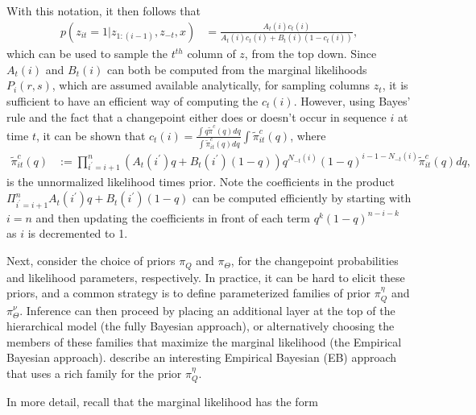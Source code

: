 \documentclass[14pt]{extreport}
\begin{document}
With this notation, it then follows that
\begin{align*}
  p\left(z_{it} = 1 \vert z_{1:(i - 1)}, z_{-t}, x\right) &= \frac{A_{t}\left(i\right)c_{t}\left(i\right)}{A_{t}\left(i\right)c_t\left(i\right) + B_t\left(i\right)\left(1 - c_t\left(i\right)\right)},
\end{align*}
which can be used to sample the $t^{th}$ column of $z$, from the top down. Since
$A_{t}\left(i\right)$ and $B_{t}\left(i\right)$ can both be computed from the
marginal likelihoods $P_{i}\left(r, s\right)$, which are assumed available
analytically, for sampling columns $z_t$, it is sufficient to have an efficient
way of computing the $c_{t}\left(i\right)$. However, using Bayes' rule and the
fact that a changepoint either does or doesn't occur in sequence $i$ at time
$t$, it can be shown that $c_{t}\left(i\right) = \frac{\int q
  \tilde{\pi}^{c}\left(q\right) dq}{\int \tilde{\pi}_{it}^{c}\left(q\right)
  dq}{\int \tilde{\pi}_{it}^{c}\left(q\right)}$, where
\begin{align*}
  \tilde{\pi}_{it}^{c}\left(q\right) &:= \prod_{i^\prime = i + 1}^{n} \left(A_{t}\left(i^\prime\right)q + B_{t}\left(i^\prime\right)\left(1 - q\right)\right)q^{N_{-t}\left(i\right)}\left(1 - q\right)^{i - 1 - N_{-t}\left(i\right)} \tilde{\pi}_{it}^{c}\left(q\right) dq,
\end{align*}
is the unnormalized likelihood times prior. Note the coefficients in the product
$\Pi_{i^\prime = i + 1}^{n} A_{t}\left(i^\prime\right)q +
B_{t}\left(i^\prime\right)\left(1 - q\right)$ can be computed efficiently by
starting with $i = n$ and then updating the coefficients in front of each term
$q^k \left(1 - q\right)^{n - i - k}$ as $i$ is decremented to 1.

Next, consider the choice of priors $\pi_{Q}$ and $\pi_{\Theta}$, for the
changepoint probabilities and likelihood parameters, respectively. In practice,
it can be hard to elicit these priors, and a common strategy is to define
parameterized families of prior $\pi_{Q}^{\eta}$ and $\pi_{\Theta}^{\nu}$.
Inference can then proceed by placing an additional layer at the top of the
hierarchical model (the fully Bayesian approach), or alternatively choosing the
members of these families that maximize the marginal likelihood (the Empirical
Bayesian approach). \citep{fan2015empirical} describe an interesting Empirical
Bayesian (EB) approach that uses a rich family for the prior $\pi_{Q}^{\eta}$.

In more detail, recall that the marginal likelihood has the form
\begin{align}
 \label{eq:pi_q_marginal_lik}
\end{align}
\end{document}
